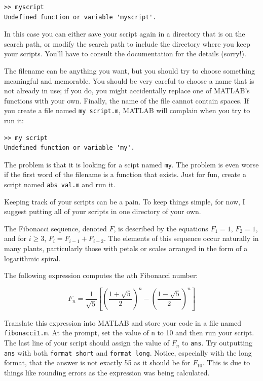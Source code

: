 \documentclass{book}
\begin{document}
\begin{verbatim}
>> myscript
Undefined function or variable 'myscript'.
\end{verbatim}

In this case you can either save your script again in a directory
that is on the search path, or modify the search path to include
the directory where you keep your scripts.  You'll have to consult
the documentation for the details (sorry!).

The filename can be anything you want, but you should try to choose
something meaningful and memorable.  You should be very careful to choose a
name that is not already in use; if you do, you might accidentally
replace one of MATLAB's functions with your own.
Finally, the name of the file cannot contain spaces.  If you create
a file named {\tt my script.m}, MATLAB will complain when you try
to run it:

\begin{verbatim}
>> my script
Undefined function or variable 'my'.
\end{verbatim}

The problem is that it is looking for a scipt named {\tt my}.  The
problem is even worse if the first word of the filename is a function
that exists.  Just for fun, create a script named {\tt abs val.m}
and run it.

Keeping track of your scripts can be a pain.  To keep things simple,
for now, I suggest putting all of your scripts in one
directory of your own.

\begin{ex}
The Fibonacci sequence, denoted $F$, is described by the equations
$F_1 = 1$, $F_2 = 1$, and for $i \ge 3$, $F_{i} = F_{i-1} + F_{i-2}$.
The elements of this sequence occur naturally in many plants,
particularly those with petals or scales arranged in the form of a
logarithmic spiral.

The following expression computes the
$n$th Fibonacci number:

\begin{equation}
F_n = \frac{1}{\sqrt{5}}
\left[ 
\left( \frac{1 + \sqrt{5}}{2} \right)^{n} -
\left( \frac{1 - \sqrt{5}}{2} \right)^{n}
\right]
\end{equation}

Translate this expression into MATLAB and store your
code in a file named {\tt fibonacci1.m}.  At the prompt, set the value
of {\tt n} to 10 and then run your script.  The last line of your
script should assign the value of $F_n$ to {\tt ans}.
Try outputting {\tt ans} with both {\tt format short} and {\tt format long}.
Notice, especially with the long format, that the answer is not exactly
55 as it should be for $F_{10}$.  This is due to things like rounding errors
as the expression was being calculated.
\end{ex}
\end{document}
